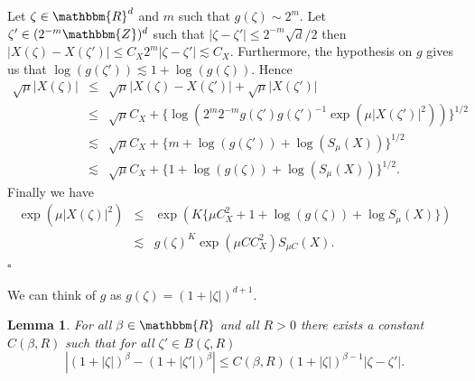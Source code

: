 \documentclass[a4paper,11pt]{article}
\newtheorem{lemma}[theorem]{Lemma}
\newenvironment{proof}{{\sc Proof.}}{\hfill$\square$}
\begin{document}
\begin{proof}
  Let $\zeta \in \mathbbm{R}^{d}$ and $m$ such that $g ( \zeta ) \sim 2^{m}$.
  Let $\zeta' \in ( 2^{-m} \mathbbm{Z} )^{d}$ such that $| \zeta - \zeta' |
  \leqslant 2^{-m} \sqrt{d} /2$ then
  $ | X ( \zeta ) -X ( \zeta' ) | \leqslant C_{X} 2^{m} | \zeta - \zeta' |
     \lesssim C_{X} $. 
  Furthermore, the hypothesis on $g$ gives us that $\log ( g ( \zeta' ) )
  \lesssim 1+ \log ( g ( \zeta ) )$. Hence
  \begin{eqnarray*}
    \sqrt{\mu} | X ( \zeta ) | & \leqslant & \sqrt{\mu} | X ( \zeta ) -X (
    \zeta' ) | + \sqrt{\mu} | X ( \zeta' ) |\\
    & \leqslant & \sqrt{\mu} C_{X} + \{ \log (^{} 2^{m} 2^{-m} g ( \zeta' ) g
    ( \zeta' )^{-1} \exp ( \mu | X ( \zeta' ) |^{2} ) ) \}^{1/2}\\
    & \lesssim & \sqrt{\mu} C_{X} + \{ m+ \log ( g ( \zeta' ) ) + \log (
    S_{\mu} ( X ) ) \}^{1/2}\\
    & \lesssim & \sqrt{\mu} C_{X} + \{ 1+ \log ( g ( \zeta ) ) + \log (
    S_{\mu} ( X ) ) \}^{1/2} .
  \end{eqnarray*}
  Finally we have
  \begin{eqnarray*}
    \exp ( \mu | X ( \zeta ) |^{2} ) & \leqslant & \exp ( K \{ \mu C_{X}^{2}
    +1+ \log ( g ( \zeta ) ) + \log  S_{\mu} ( X ) \} )\\
    & \lesssim & g ( \zeta )^{K} \exp ( \mu C C_{X}^{2} ) S_{\mu C} ( X ) .
  \end{eqnarray*}
\end{proof}

We can think of $g$ as $g ( \zeta ) = ( 1+ | \zeta | )^{d+1}$.

\begin{lemma}
  \label{lemma_holder_Y}For all $\beta \in \mathbbm{R}$ and all $R>0$ there
  exists a constant $C ( \beta ,R )$ such that for all $\zeta' \in B ( \zeta
  ,R )$
  \[ | ( 1+ | \zeta | )^{\beta} - ( 1+ | \zeta' | )^{\beta} | \leqslant C (
     \beta ,R ) ( 1+ | \zeta | )^{\beta -1} | \zeta - \zeta' |. \]
\end{lemma}
\end{document}

